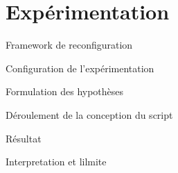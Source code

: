 \section{Expérimentation}
\begin{frame}{Framework de reconfiguration}
    
\end{frame}

\begin{frame}{Configuration de l'expérimentation}
    
\end{frame}

\begin{frame}{Formulation des hypothèses}
\end{frame}

\begin{frame}{Déroulement de la conception du script}
\end{frame}

\begin{frame}{Résultat}
\end{frame}

\begin{frame}{Interpretation et lilmite}
\end{frame}
